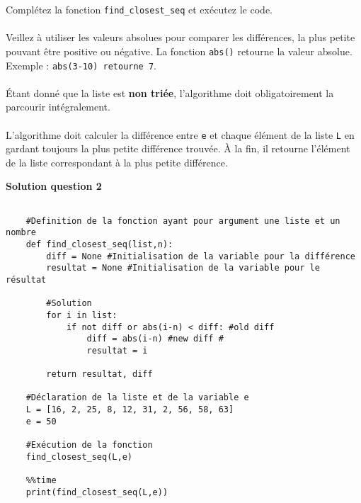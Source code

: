 \begin{Exercice}[10 minutes]
    \begin{conseil}
        Complétez la fonction \lstinline{find_closest_seq} et exécutez le code.\\\\
        Veillez à utiliser les valeurs absolues pour comparer les différences, la plus petite pouvant être positive ou négative. La fonction \lstinline{abs()} retourne la valeur absolue. Exemple : \lstinline{abs(3-10) retourne 7}.\\\\
        Étant donné que la liste est \textbf{non triée}, l'algorithme doit obligatoirement la parcourir intégralement.\\\\
        L'algorithme doit calculer la différence entre \lstinline{e} et chaque élément de la liste \lstinline{L} en gardant toujours la plus petite différence trouvée. À la fin, il retourne l'élément de la liste correspondant à la plus petite différence.  
    \end{conseil}
    
    \textbf{Solution question 2}
    
    \begin{verbatim}
    
    #Definition de la fonction ayant pour argument une liste et un nombre 
    def find_closest_seq(list,n):
        diff = None #Initialisation de la variable pour la différence
        resultat = None #Initialisation de la variable pour le résultat
        
        #Solution
        for i in list:
            if not diff or abs(i-n) < diff: #old diff
                diff = abs(i-n) #new diff # 
                resultat = i
                
        return resultat, diff
    
    #Déclaration de la liste et de la variable e
    L = [16, 2, 25, 8, 12, 31, 2, 56, 58, 63]  
    e = 50
    
    #Exécution de la fonction
    find_closest_seq(L,e)
    
    %%time 
    print(find_closest_seq(L,e))
    
    \end{verbatim}
    
\end{Exercice}

